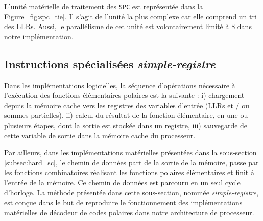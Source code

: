 L'unité matérielle de traitement des \noeuds \texttt{SPC} est représentée dans la Figure~\ref{fig:spc_tie}. Il s'agit de l'unité la plus complexe car elle comprend un tri des LLRs. Aussi, le parallélisme de cet unité est volontairement limité à 8 dans notre implémentation.

\subsection{Instructions spécialisées \textit{simple-registre}}

Dans les implémentations logicielles, la séquence d'opérations nécessaire à l'exécution des fonctions élémentaires polaires est la suivante : i) chargement depuis la mémoire cache vers les registres des variables d'entrée (LLRs et / ou sommes partielles), ii) calcul du résultat de la fonction élémentaire, en une ou plusieurs étapes, dont la sortie est stockée dans un registre, iii) sauvegarde de cette variable de sortie dans la mémoire cache du processeur.

Par ailleurs, dans les implémentations matérielles présentées dans la sous-section \ref{subsec:hard_sc}, le chemin de données part de la sortie de la mémoire, passe par les fonctions combinatoires réalisant les fonctions polaires élémentaires et finit à l'entrée de la mémoire. Ce chemin de données est parcouru en un seul cycle d'horloge. La méthode présentée dans cette sous-section, nommée \textit{simple-registre}, est conçue dans le but de reproduire le fonctionnement des implémentations matérielles de décodeur de codes polaires dans notre architecture de processeur.

